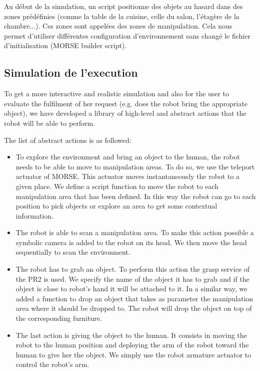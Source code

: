 \documentclass[a4paper,11pt,twoside]{StyleThese}
\begin{document}
 
Au début de la simulation, un script positionne des objets au hasard dans des zones prédéfinies (comme la table de la cuisine, celle du salon, l'étagère de la chambre...). Ces zones sont appelées des zones de manipulation. Cela nous permet d'utiliser différentes configuration d'environnement sans changé le fichier d'initialisation (MORSE builder script).

\subsection{Simulation de l'execution}
\label{section:actions}
To get a more interactive and realistic simulation and also for the user to
evaluate the fulfilment of her request (e.g. does the robot bring the appropriate object),
we have developed a library of high-level and abstract actions that the robot will be able to perform.

The list of abstract actions is as followed:
\begin{itemize}

\item To explore the environment and bring an object to the human, the robot needs to be able to move to manipulation areas. To do so, we use the teleport actuator of MORSE. This actuator moves instantaneously the robot to a given place. We define a script function to move the robot to each manipulation area that has been defined. In this way the robot can go to each position to pick objects or explore an area to get some contextual information.

\item The robot is able to scan a manipulation area. To make this action possible a symbolic camera is added to the robot on its head. We then move the head sequentially to scan the environment.

\item The robot has to grab an object. To perform this action the grasp service of the PR2 is used. We specify the name of the object it has to grab and if the object is close to robot's hand it will be attached to it. In a similar way, we added a function to drop an object that takes as parameter the manipulation area where it should be dropped to. The robot will drop the object on top of the corresponding furniture.

\item The last action is giving the object to the human. It consists in moving the robot to the human position and deploying the arm of the robot toward the human to give her the object. We simply use the robot armature actuator to control the robot's arm.
\end{itemize}
\end{document}

